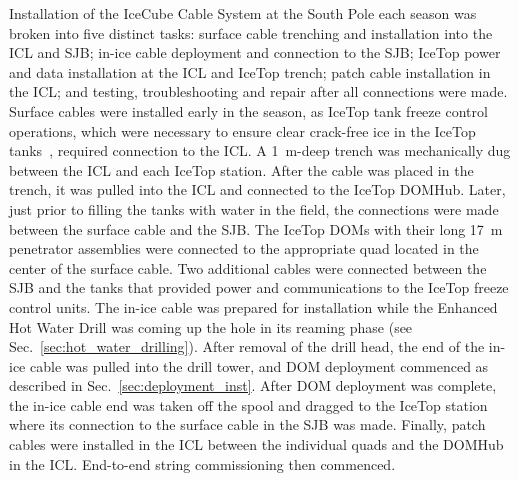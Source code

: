 Installation of the IceCube Cable System at the South Pole each season was
broken into five distinct tasks: surface cable trenching and
installation into the ICL and SJB; in-ice cable deployment and
connection to the SJB; IceTop power and data installation at the ICL and
IceTop trench; patch cable installation in the ICL; and testing,
troubleshooting and repair after all connections were made. Surface cables
were installed early in the season, as IceTop tank freeze control
operations, which were necessary to ensure clear crack-free ice in the
IceTop tanks~\cite{ICECUBE:IceTop},
required connection to the ICL. A 1~m-deep trench was mechanically
dug between the ICL and each IceTop station. After the cable was placed in
the trench, it was pulled into the ICL and connected to the IceTop
DOMHub. Later, just prior to filling the tanks with water in the field, the
connections were made between the surface cable and the SJB. The IceTop
DOMs with their long 17~m penetrator assemblies were connected to the
appropriate quad located in the center of the surface cable. Two additional
cables were connected between the SJB and the tanks that provided power and
communications to the IceTop freeze control units. The in-ice cable
was prepared for installation while the Enhanced Hot Water Drill was coming
up the hole in its reaming phase (see
Sec.~\ref{sec:hot_water_drilling}). After removal of the drill head,
the end of the in-ice cable was pulled into the drill tower, and DOM deployment
commenced as described in Sec.~\ref{sec:deployment_inst}. After DOM
deployment was complete, the in-ice cable end was taken off the spool and
dragged to the IceTop station where its connection to the surface cable in the SJB was
made. Finally, patch cables were installed in the ICL between the
individual quads and the DOMHub in the ICL. End-to-end string commissioning
then commenced.

